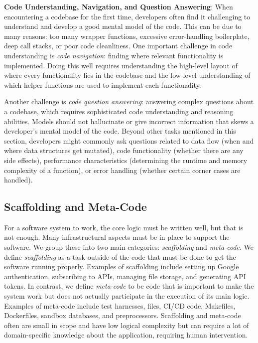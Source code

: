 \textbf{Code Understanding, Navigation, and Question Answering}: When encountering a codebase for the first time, developers often find it challenging to understand and develop a good mental model of the code. This can be due to many reasons: too many wrapper functions, excessive error-handling boilerplate, deep call stacks, or poor code cleanliness. One important challenge in code understanding is \textit{code navigation}: finding where relevant functionality is implemented. Doing this well requires understanding the high-level layout of where every functionality lies in the codebase and the low-level understanding of which helper functions are used to implement each functionality. 

Another challenge is \textit{code question answering}: answering complex questions about a codebase, which requires sophisticated code understanding and reasoning abilities. Models should not hallucinate or give incorrect information that skews a developer's mental model of the code. Beyond other tasks mentioned in this section, developers might commonly ask questions related to data flow (when and where data structures get mutated), code functionality (whether there are any side effects), performance characteristics (determining the runtime and memory complexity of a function), or error handling (whether certain corner cases are handled). 


\subsection{Scaffolding and Meta-Code}

For a software system to work, the core logic must be written well, but that is not enough. Many infrastructural aspects must be in place to support the software. We group these into two main categories: \textit{scaffolding} and \textit{meta-code}. We define \textit{scaffolding} as a task outside of the code that must be done to get the software running properly. Examples of scaffolding include setting up Google authentication, subscribing to APIs, managing file storage, and generating API tokens. In contrast, we define \textit{meta-code} to be code that is important to make the system work but does not actually participate in the execution of its main logic. Examples of meta-code include test harnesses, files, CI/CD code, Makefiles, Dockerfiles, sandbox databases, and preprocessors. Scaffolding and meta-code often are small in scope and have low logical complexity but can require a lot of domain-specific knowledge about the application, requiring human intervention.

